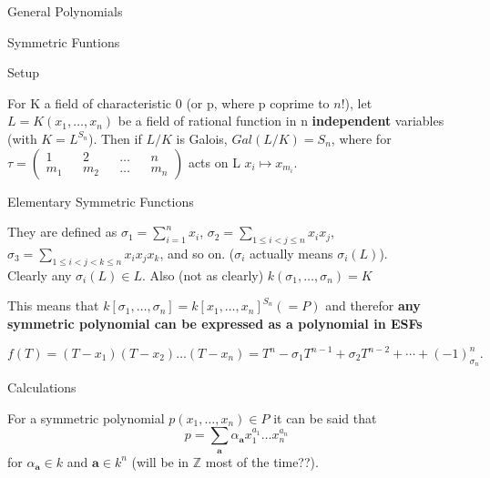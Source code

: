 \documentclass[12pt, letterpaper]{article}
\newcommand{\Z}{\mathbb{Z}}
\begin{document}
\begin{section}{General Polynomials}

  \begin{subsection}{Symmetric Funtions}

    \begin{subsubsection}{Setup}

      For K a field of characteristic 0 (or p, where p coprime to \(n!\)), let
      \(L = K(x_{1}, \dots , x_{n})\) be a field of rational function in n
      \textbf{independent} variables (with \(K = L^{S_{n}}\)). Then if \(L / K\)
      is Galois, \(Gal(L / K) = S_{n}\), where for \(\tau =
      \begin{pmatrix}
        1 && 2 && \dots && n \\
        m_{1} && m_{2} && \dots && m_{n}
      \end{pmatrix}\) acts on L \(x_{i} \mapsto x_{m_{i}}\).

    \end{subsubsection}

    \begin{subsubsection}{Elementary Symmetric Functions}

      They are defined as \(\sigma_{1} = \sum^{n}_{i = 1} x_{i}\),
      \(\sigma_{2} = \sum_{1 \leq i < j \leq n} x_{i} x_{j}\),
      \(\sigma_{3} = \sum_{1 \leq i < j < k \leq n} x_{i} x_{j} x_{k}\),
      and so on. (\(\sigma_{i}\) actually means \(\sigma_{i}(L)\)). \\
      Clearly any \(\sigma_{i}(L) \in L\). Also (not as clearly)
      \(k(\sigma_{1}, \dots , \sigma_{n}) = K\)

      This means that \(k[\sigma_{1}, \dots , \sigma_{n}] =
      k[x_{1}, \dots , x_{n}]^{S_{n}} (= P)\) and therefor
      \textbf{any symmetric polynomial can be expressed as a polynomial in ESFs}

      \(f(T) = (T - x_{1})(T - x_{2}) \dots (T - x_{n}) =
      T^{n} - \sigma_{1} T^{n - 1} + \sigma_{2} T^{n - 2} + \cdots +
      (-1)^{n}_{\sigma_{n}}.\)

    \end{subsubsection}

    \begin{subsubsection}{Calculations}

      For a symmetric polynomial \(p(x_{1}, \dots , x_{n}) \in P\) it can be
      said that
      \[p = \sum_{\textbf{a}} \alpha_{\textbf{a}} x^{a_{1}}_{1} \dots x^{a_{n}}_{n}\]
      for \(\alpha_{\textbf{a}} \in k\) and \(\textbf{a} \in k^{n}\) (will be in
      \(\Z\) most of the time??).


\end{subsubsection}
\end{subsection}
\end{section}
\end{document}
